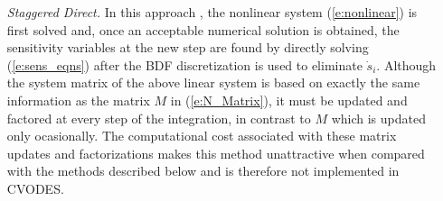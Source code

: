 \begin{itemize}

\item[{\em Staggered Direct.}]
  In this approach \cite{CaSt:85}, the nonlinear system (\ref{e:nonlinear}) is first 
  solved and, once an acceptable numerical solution is obtained, the sensitivity 
  variables at the new step are found by directly solving (\ref{e:sens_eqns}) 
  after the BDF discretization is used to eliminate ${\dot s}_i$. 
  Although the system matrix of the above linear system is based on exactly the same 
  information as the matrix $M$ in (\ref{e:N_Matrix}), it must be updated and factored 
  at every step of the integration, in contrast to $M$ which is updated only ocasionally. 
  The computational cost associated with these matrix updates and factorizations 
  makes this method unattractive when compared with the methods described below and 
  is therefore not implemented in CVODES.
  

\end{itemize}
